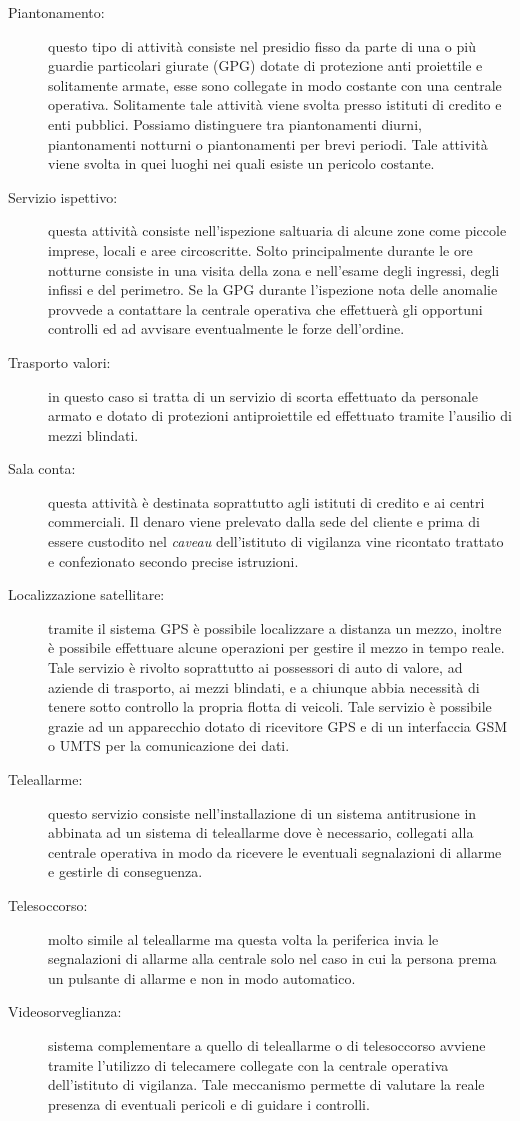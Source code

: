 \begin{description}
	\item[Piantonamento:] questo tipo di attività consiste nel presidio fisso da parte di una o più guardie particolari giurate (GPG) dotate di protezione anti proiettile e solitamente armate, esse sono collegate in modo costante con una centrale operativa. Solitamente tale attività viene svolta presso istituti di credito e enti pubblici. Possiamo distinguere tra piantonamenti diurni, piantonamenti notturni o piantonamenti per brevi periodi. Tale attività viene svolta in quei luoghi nei quali esiste un pericolo costante.
	\item[Servizio ispettivo:] questa attività consiste nell'ispezione saltuaria di alcune zone come piccole imprese, locali e aree circoscritte. Solto principalmente durante le ore notturne consiste in una visita della zona e nell'esame degli ingressi, degli infissi e del perimetro. Se la GPG durante l'ispezione nota delle anomalie provvede a contattare la centrale operativa che effettuerà gli opportuni controlli ed ad avvisare eventualmente le forze dell'ordine.
	\item[Trasporto valori:] in questo caso si tratta di un servizio di scorta effettuato da personale armato e dotato di protezioni antiproiettile ed effettuato tramite l'ausilio di mezzi blindati.
	\item[Sala conta:] questa attività è destinata soprattutto agli istituti di credito e ai centri commerciali. Il denaro viene prelevato dalla sede del cliente e prima di essere custodito nel \emph{caveau} dell'istituto di vigilanza vine ricontato trattato e confezionato secondo precise istruzioni.
	\item[Localizzazione satellitare:] tramite il sistema GPS è possibile localizzare a distanza un mezzo, inoltre è possibile effettuare alcune operazioni per gestire il mezzo in tempo reale. Tale servizio è rivolto soprattutto ai possessori di auto di valore, ad aziende di trasporto, ai mezzi blindati, e a chiunque abbia necessità di tenere sotto controllo la propria flotta di veicoli. Tale servizio è possibile grazie ad un apparecchio dotato di ricevitore GPS e di un interfaccia GSM o UMTS per la comunicazione dei dati.
	\item[Teleallarme:] questo servizio consiste nell'installazione di un sistema antitrusione in abbinata ad un sistema di teleallarme dove è necessario, collegati alla centrale operativa in modo da ricevere le eventuali segnalazioni di allarme e gestirle di conseguenza.
	\item[Telesoccorso:] molto simile al teleallarme ma questa volta la periferica invia le segnalazioni di allarme alla centrale solo nel caso in cui la persona prema un pulsante di allarme e non in modo automatico.
	\item[Videosorveglianza:] sistema complementare a quello di teleallarme o di telesoccorso avviene tramite l'utilizzo di telecamere collegate con la centrale operativa dell'istituto di vigilanza. Tale meccanismo permette di valutare la reale presenza di eventuali pericoli e di guidare i controlli.
\end{description}
